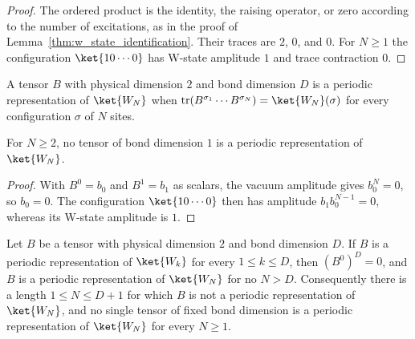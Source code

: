 \begin{proof}
    \leanok
    The ordered product is the identity, the raising operator, or zero according
    to the number of excitations, as in the proof of
    Lemma~\ref{thm:w_state_identification}. Their traces are $2$, $0$, and $0$.
    For $N\geq1$ the configuration $\ket{10\cdots0}$ has W-state amplitude $1$
    and trace contraction $0$.
\end{proof}

\begin{definition}%
    \label{def:w_state_periodic_rep}
    \leanok
    A tensor $B$ with physical dimension $2$ and bond dimension $D$ is a periodic
    representation of $\ket{W_N}$ when
    $\operatorname{tr}(B^{\sigma_1}\cdots B^{\sigma_N})=\ket{W_N}(\sigma)$ for every
    configuration $\sigma$ of $N$ sites.
\end{definition}

\begin{lemma}%
    \label{thm:w_state_periodic_bond_one}
    \leanok
    For $N\geq 2$, no tensor of bond dimension $1$ is a periodic representation of
    $\ket{W_N}$.
\end{lemma}

\begin{proof}
    \leanok
    With $B^0=b_0$ and $B^1=b_1$ as scalars, the vacuum amplitude gives
    $b_0^N=0$, so $b_0=0$. The configuration $\ket{10\cdots0}$ then has amplitude
    $b_1b_0^{N-1}=0$, whereas its W-state amplitude is $1$.
\end{proof}

\begin{lemma}%
    \label{thm:w_state_periodic_bound}
    \leanok
    Let $B$ be a tensor with physical dimension $2$ and bond dimension $D$. If $B$
    is a periodic representation of $\ket{W_k}$ for every $1\leq k\leq D$, then
    $(B^0)^D=0$, and $B$ is a periodic representation of $\ket{W_N}$ for no
    $N>D$. Consequently there is a length $1\leq N\leq D+1$ for which $B$ is not
    a periodic representation of $\ket{W_N}$, and no single tensor of fixed bond
    dimension is a periodic representation of $\ket{W_N}$ for every $N\geq 1$.
\end{lemma}


